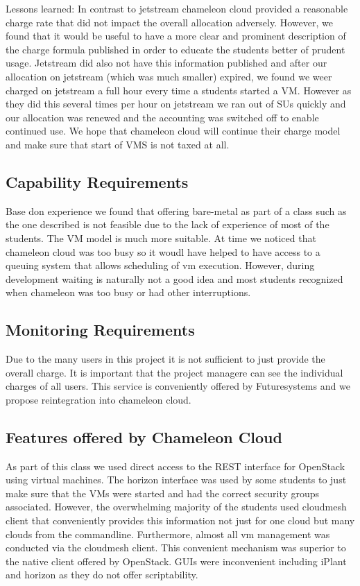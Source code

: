 \documentclass[sigconf]{acmart}
\begin{document}
Lessons learned: In contrast to jetstream chameleon cloud provided a
reasonable charge rate that did not impact the overall allocation
adversely. However, we found that it would be useful to have a more
clear and prominent description of the charge formula published in
order to educate the students better of prudent usage. Jetstream did
also not have this information published and after our allocation on
jetstream (which was much smaller) expired, we found we weer charged
on jetstream a full hour every time a students started a VM. However
as they did this several times per hour on jetstream we ran out of SUs
quickly and our allocation was renewed and the accounting was switched
off to enable continued use. We hope that chameleon cloud will
continue their charge model and make sure that start of VMS is not
taxed at all.

\subsection{Capability Requirements}

Base don experience we found that offering bare-metal as part of a
class such as the one described is not feasible due to the lack of
experience of most of the students. The VM model is much more
suitable. At time we noticed that chameleon cloud was too busy so it
woudl have helped to have access to a queuing system that allows
scheduling of vm execution. However, during development waiting is
naturally not a good idea and most students recognized when chameleon
was too busy or had other interruptions.

\subsection{Monitoring Requirements}

Due to the many users in this project it is not sufficient to just
provide the overall charge. It is important that the project managere
can see the individual charges of all users. This service is
conveniently offered by Futuresystems and we propose reintegration
into chameleon cloud.

\subsection{Features offered by Chameleon Cloud}

As part of this class we used direct access to the REST interface for
OpenStack using virtual machines. The horizon interface was used by
some students to just make sure that the VMs were started and had the
correct security groups associated. However, the overwhelming majority
of the students used cloudmesh client that conveniently provides this
information not just for one cloud but many clouds from the
commandline. Furthermore, almost all vm management was conducted via
the cloudmesh client. This convenient mechanism was superior to the
native client offered by OpenStack. GUIs were inconvenient including
iPlant and horizon as they do not offer scriptability.
\end{document}
